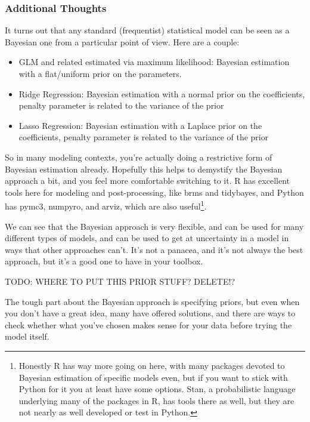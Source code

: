 \documentclass[
  letterpaper,
]{krantz}
\providecommand{\tightlist}{%
  \setlength{\itemsep}{0pt}\setlength{\parskip}{0pt}}\usepackage{longtable,booktabs,array}
\begin{document}
\subsubsection{Additional Thoughts}\label{additional-thoughts}

It turns out that any standard (frequentist) statistical model can be
seen as a Bayesian one from a particular point of view. Here are a
couple:

\begin{itemize}
\tightlist
\item
  GLM and related estimated via maximum likelihood: Bayesian estimation
  with a flat/uniform prior on the parameters.
\item
  Ridge Regression: Bayesian estimation with a normal prior on the
  coefficients, penalty parameter is related to the variance of the
  prior
\item
  Lasso Regression: Bayesian estimation with a Laplace prior on the
  coefficients, penalty parameter is related to the variance of the
  prior
\end{itemize}

So in many modeling contexts, you're actually doing a restrictive form
of Bayesian estimation already. Hopefully this helps to demystify the
Bayesian approach a bit, and you feel more comfortable switching to it.
R has excellent tools here for modeling and post-processing, like brms
and tidybayes, and Python has pymc3, numpyro, and arviz, which are also
useful\footnote{Honestly R has way more going on here, with many
  packages devoted to Bayesian estimation of specific models even, but
  if you want to stick with Python for it you at least have some
  options. Stan, a probabilistic language underlying many of the
  packages in R, has tools there as well, but they are not nearly as
  well developed or test in Python.}.

We can see that the Bayesian approach is very flexible, and can be used
for many different types of models, and can be used to get at
uncertainty in a model in ways that other approaches can't. It's not a
panacea, and it's not always the best approach, but it's a good one to
have in your toolbox.

TODO: WHERE TO PUT THIS PRIOR STUFF? DELETE!?

The tough part about the Bayesian approach is specifying priors, but
even when you don't have a great idea, many have offered solutions, and
there are ways to check whether what you've chosen makes sense for your
data before trying the model itself.
\end{document}
